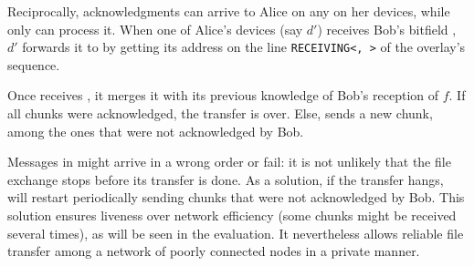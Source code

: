 
Reciprocally, acknowledgments can arrive to Alice on any on her devices, while only \sendingdevice can process it.
When one of Alice's devices (say $d'$) receives Bob's bitfield \bitfield, 
$d'$ forwards it to \sendingdevice by getting its address on the line \texttt{RECEIVING<\sendingdevice, \fileid>} of the \squad overlay's sequence.


Once \sendingdevice receives \bitfield, it merges it with its previous knowledge of Bob's reception of $f$.
If all chunks were acknowledged, the transfer is over.
Else, \sendingdevice sends a new chunk, among the ones that were not acknowledged by Bob.

Messages in \name might arrive in a wrong order or fail:
it is not unlikely that the file exchange stops before its transfer is done.
As a solution, if the transfer hangs, \sendingdevice will restart periodically sending chunks that were not acknowledged by Bob.
This solution ensures liveness over network efficiency (some chunks might be received several times), as will be seen in the evaluation.
It nevertheless allows reliable file transfer among a network of poorly connected nodes in a private manner.